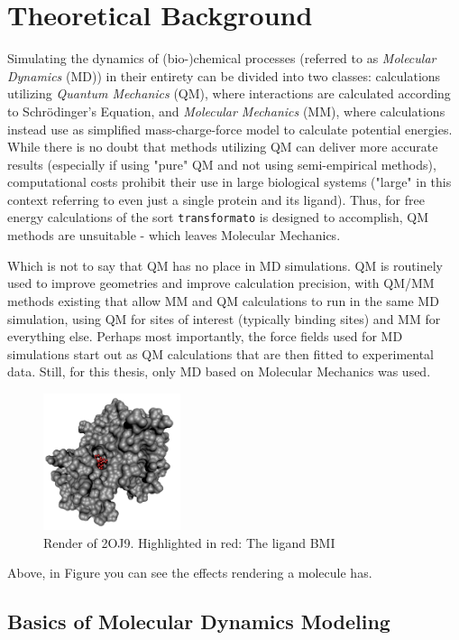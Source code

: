 \documentclass[oneside]{scrreprt}
\begin{document}
\section{Theoretical Background}
Simulating the dynamics of (bio-)chemical processes (referred to as \emph{Molecular Dynamics} (MD)) in their entirety can be divided into two classes: calculations utilizing \emph{Quantum Mechanics} (QM), where interactions are calculated according to Schrödinger's Equation, and \emph{Molecular Mechanics} (MM), where calculations instead use as simplified mass-charge-force model to calculate potential energies. While there is no doubt that methods utilizing QM can deliver more accurate results (especially if using "pure" QM and not using semi-empirical methods), computational costs prohibit their use in large biological systems ("large" in this context referring to even just a single protein and its ligand). Thus, for free energy calculations of the sort \texttt{transformato} is designed to accomplish, QM methods are unsuitable - which leaves Molecular Mechanics.

Which is not to say that QM has no place in MD simulations. QM is routinely used to improve geometries and improve calculation precision, with QM/MM methods existing that allow MM and QM calculations to run in the same MD simulation, using QM for sites of interest (typically binding sites) and MM for everything else. Perhaps most importantly, the force fields used for MD simulations start out as QM calculations that are then fitted to experimental data. Still, for this thesis, only MD based on Molecular Mechanics was used.


\begin{figure}[h]
\centering
 \includegraphics[height=4cm]{2oj9_render_complex.png} 

\caption{Render of 2OJ9. Highlighted in red: The ligand BMI}
\label{fig:vmdrender}
\end{figure}
Above, in Figure  you can see the effects rendering a molecule has.


\subsection{Basics of Molecular Dynamics Modeling}
\end{document}
